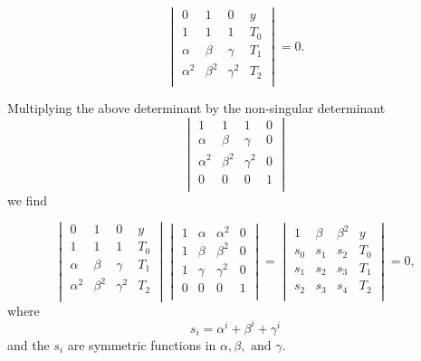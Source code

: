 \begin{equation}
\begin{vmatrix}
0            & 1           & 0               &  y    \\
1            & 1           & 1               &  T_0\\
\alpha    & \beta     & \gamma    &  T_1\\
\alpha^2 & \beta^2 & \gamma^2 & T_2 \\
\end{vmatrix} = 0.
\end{equation}

Multiplying the above determinant by the non-singular determinant 
\begin{equation}
\begin{vmatrix}
1            & 1           & 1               &  0  \\
\alpha    & \beta     & \gamma    &  0   \\
\alpha^2 & \beta^2 & \gamma^2 & 0   \\
0            & 0           & 0               &  1   \\
\end{vmatrix} 
\end{equation}we find

\begin{equation}
\begin{vmatrix}
0            & 1           & 0               &  y     \\
1            & 1           & 1               &  T_0 \\
\alpha    & \beta     & \gamma    &  T_1 \\
\alpha^2 & \beta^2 & \gamma^2 & T_2  \\
\end{vmatrix} 
\begin{vmatrix}
1   & \alpha    & \alpha^2   &  0    \\
1   & \beta      & \beta^2    &  0    \\
1   & \gamma & \gamma^2 & 0    \\
0    & 0           & 0               &  1    \\
\end{vmatrix}
=
\begin{vmatrix}
1            & \beta     & \beta^2      &  y    \\
s_0        & s_1       & s_2             &  T_0\\
s_1        & s_2       & s_3             &  T_1\\
s_2        &s_3        & s_4             & T_2 \\
\end{vmatrix} = 0,
\label{BandPFinal}\end{equation}
where \[s_i = \alpha^i + \beta^i + \gamma^i\] and the $s_i$ are symmetric functions in $\alpha, \beta, \mbox{  and } \gamma$. \\ 

